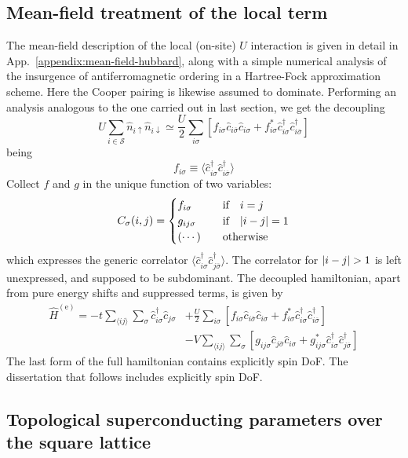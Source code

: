 \subsection{Mean-field treatment of the local term}

The mean-field description of the local (on-site) $U$ interaction is given in detail in App.~\ref{appendix:mean-field-hubbard}, along with a simple numerical analysis of the insurgence of antiferromagnetic ordering in a Hartree-Fock approximation scheme. Here the Cooper pairing is likewise assumed to dominate. Performing an analysis analogous to the one carried out in last section, we get the decoupling
\[
	U \sum_{i \in \mathcal{S}} \hat n_{i\uparrow} \hat n_{i\downarrow} \simeq \frac{U}{2} \sum_{i\sigma} \left[
		f_{i\sigma} \hat c_{i\overline{\sigma}} \hat c_{i\sigma} + f_{i\sigma}^* \hat c_{i\sigma}^\dagger \hat c_{i\overline{\sigma}}^\dagger
	\right]
\]
being
\[
	f_{i\sigma} \equiv \langle \hat c_{i\sigma}^\dagger \hat c_{i\overline{\sigma}}^\dagger \rangle
\]
Collect $f$ and $g$ in the unique function of two variables:
\[
	C_\sigma(i,j) = \begin{cases}
		f_{i\sigma} &\qq{if} i=j \\
		g_{ij\sigma} &\qq{if} \abs{i-j}=1 \\
		(\cdots) &\qq{otherwise}
	\end{cases}
\]
which expresses the generic correlator $\langle \hat c_{i\sigma}^\dagger \hat c_{j\overline{\sigma}}^\dagger \rangle$. The correlator for $\abs{i-j}>1$ is left unexpressed, and supposed to be subdominant. The decoupled hamiltonian, apart from pure energy shifts and suppressed terms, is given by
\begin{align}
	\hat H^{(\mathrm{e})} =
	-t \sum_{\langle ij \rangle} \sum_\sigma \hat c_{i\sigma}^\dagger \hat c_{j\sigma}
	&+ \frac{U}{2} \sum_{i\sigma} \left[
		f_{i\sigma} \hat c_{i\overline{\sigma}} \hat c_{i\sigma} + f_{i\sigma}^* \hat c_{i\sigma}^\dagger \hat c_{i\overline{\sigma}}^\dagger
	\right] \nonumber \\
	&- V \sum_{\langle ij \rangle} \sum_\sigma \left[
	g_{ij\sigma} \hat c_{j\overline{\sigma}} \hat c_{i\sigma} + g_{ij\sigma}^* \hat c_{i\sigma}^\dagger \hat c_{j\overline{\sigma}}^\dagger
	\right] \label{eq:extended-hubbard-model-effective}
\end{align}
The last form of the full hamiltonian contains explicitly spin DoF. The dissertation that follows includes explicitly spin DoF.

\subsection{Topological superconducting parameters over the square lattice}

